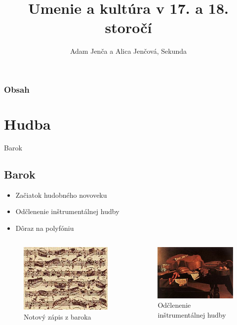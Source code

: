 \documentclass[dvipsnames]{beamer}
\title{Umenie a kultúra v 17. a 18. storočí}
\author{Adam Jenča a  Alica Jenčová, Sekunda}
\begin{document}
\begin{frame}
	\titlepage
\end{frame}
\begin{frame}
	\frametitle {Obsah}
	\begin{multicols}{2}
		\tableofcontents
	\end{multicols}
\end{frame}
\section{Hudba}
\frame{\sectionpage}
\begin{frame}{Barok}
	\subsection{Barok}
	\begin{itemize}
		\item Začiatok hudobného novoveku
		\item Odčlenenie inštrumentálnej hudby
		\item Dôraz na polyfóniu
	\end{itemize}
	\begin{columns}
		
		\kern0pt
		\begin{figure}
		\includegraphics[scale=1.5]{baroko}
		\caption{Notový zápis z baroka}
		\end{figure}%
		
		\begin{figure}
			\includegraphics[scale=1.5]{in}
			\caption{Odčlenenie inštrumentálnej hudby}
		\end{figure}
	\end{columns}

\end{frame}
\end{document}
